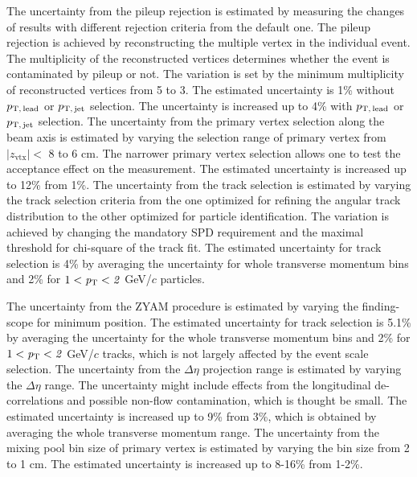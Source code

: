 The uncertainty from the pileup rejection is estimated by measuring the changes of results with different rejection criteria from the default one. The pileup rejection is achieved by reconstructing the multiple vertex in the individual event. The multiplicity of the reconstructed vertices determines whether the event is contaminated by pileup or not. The variation is set by the minimum multiplicity of reconstructed vertices from 5 to 3. 
The estimated uncertainty is 1\% without $p_\mathrm{T,\,lead}$ or $p_\mathrm{T,\,jet}$ selection. The uncertainty is increased up to 4\% with $p_\mathrm{T,\,lead}$ or $p_\mathrm{T,\,jet}$ selection. The uncertainty from the primary vertex selection along the beam axis is estimated by varying the selection range of primary vertex from $|z_\mathrm{vtx}|<$ 8 to 6 cm. The narrower primary vertex selection allows one to test the acceptance effect on the measurement. The estimated uncertainty is increased up to 12\% from 1\%.
The uncertainty from the track selection is estimated by varying the track selection criteria from the one optimized for refining the angular track distribution to the other optimized for particle identification. The variation is achieved by changing the mandatory SPD requirement and the maximal threshold for chi-square of the track fit.
The estimated uncertainty for track selection is 4\% by averaging the uncertainty for whole transverse momentum bins and 2\% for $1<\it{p}_{\rm{T}}<2$ GeV/$c$ particles.

The uncertainty from the ZYAM procedure is estimated by varying the finding-scope for minimum position. The estimated uncertainty for track selection is 5.1\% by averaging the uncertainty for the whole transverse momentum bins and 2\% for $1<\it{p}_{\rm{T}}<2$ GeV/$c$ tracks, which is not largely affected by the event scale selection. The uncertainty from the $\Delta\eta$ projection range is estimated by varying the $\Delta\eta$ range. The uncertainty might include effects from the longitudinal de-correlations and possible non-flow contamination, which is thought be small. The estimated uncertainty is increased up to 9\% from 3\%, which is obtained by averaging the whole transverse momentum range. The uncertainty from the mixing pool bin size of primary vertex is estimated by varying the bin size from 2 to 1 cm. The estimated uncertainty is increased up to 8-16\% from 1-2\%.

